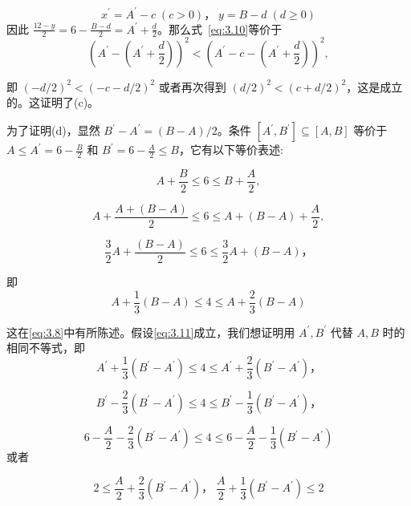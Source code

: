 \[
{x}^{\prime } = {A}^{\prime } - c\;\left( {c > 0}\right)，\;y = B - d\;\left( {d \geq  0}\right)
\]
因此 \(\frac{{12} - y}{2} = 6 - \frac{B - d}{2} = {A}^{\prime } + \frac{d}{2}\)。那么式~\eqref{eq:3.10}等价于
\[
{\left( {A}^{\prime } - \left( {A}^{\prime } + \frac{d}{2}\right) \right) }^{2} < {\left( {A}^{\prime } - c - \left( {A}^{\prime } + \frac{d}{2}\right) \right) }^{2},
\]

即 \({\left( -d/2\right) }^{2} < {\left( -c - d/2\right) }^{2}\) 或者再次得到 \({\left( d/2\right) }^{2} < {\left( c + d/2\right) }^{2}\)，这是成立的。这证明了(c)。

为了证明(d)，显然 \({B}^{\prime } - {A}^{\prime } = \left( {B - A}\right) /2\)。条件 \(\left\lbrack  {{A}^{\prime },{B}^{\prime }}\right\rbrack   \subseteq  \left\lbrack  {A,B}\right\rbrack\) 等价于 \(A \leq  {A}^{\prime } = 6 - \frac{B}{2}\) 和 \({B}^{\prime } = 6 - \frac{A}{2} \leq  B\)，它有以下等价表述:

\[
A + \frac{B}{2} \leq  6 \leq  B + \frac{A}{2},
\]

\[
A + \frac{A + \left( {B - A}\right) }{2} \leq  6 \leq  A + \left( {B - A}\right)  + \frac{A}{2},
\]

\[
\frac{3}{2}A + \frac{\left( B - A\right) }{2} \leq  6 \leq  \frac{3}{2}A + \left( {B - A}\right)，
\]

即
\begin{equation}\label{eq:3.11}
    A + \frac{1}{3}\left( {B - A}\right)  \leq  4 \leq  A + \frac{2}{3}\left( {B - A}\right)
\end{equation}

这在\eqref{eq:3.8}中有所陈述。假设\eqref{eq:3.11}成立，我们想证明用 \({A}^{\prime },{B}^{\prime }\) 代替 \(A,B\) 时的相同不等式，即
\[
{A}^{\prime } + \frac{1}{3}\left( {{B}^{\prime } - {A}^{\prime }}\right)  \leq  4 \leq  {A}^{\prime } + \frac{2}{3}\left( {{B}^{\prime } - {A}^{\prime }}\right)，
\]

\[
{B}^{\prime } - \frac{2}{3}\left( {{B}^{\prime } - {A}^{\prime }}\right)  \leq  4 \leq  {B}^{\prime } - \frac{1}{3}\left( {{B}^{\prime } - {A}^{\prime }}\right)，
\]

\[
6 - \frac{A}{2} - \frac{2}{3}\left( {{B}^{\prime } - {A}^{\prime }}\right)  \leq  4 \leq  6 - \frac{A}{2} - \frac{1}{3}\left( {{B}^{\prime } - {A}^{\prime }}\right)
\]
或者

\[
2 \leq  \frac{A}{2} + \frac{2}{3}\left( {{B}^{\prime } - {A}^{\prime }}\right)，\;\frac{A}{2} + \frac{1}{3}\left( {{B}^{\prime } - {A}^{\prime }}\right)  \leq  2
\]

